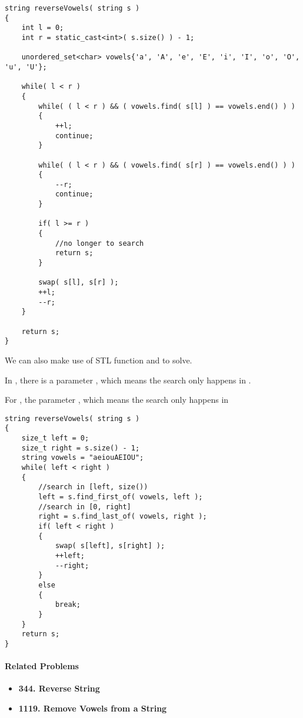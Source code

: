 \setcounter{lstlisting}{0}
\begin{lstlisting}[style=customc, caption={Two Pointers}]
string reverseVowels( string s )
{
    int l = 0;
    int r = static_cast<int>( s.size() ) - 1;

    unordered_set<char> vowels{'a', 'A', 'e', 'E', 'i', 'I', 'o', 'O', 'u', 'U'};

    while( l < r )
    {
        while( ( l < r ) && ( vowels.find( s[l] ) == vowels.end() ) )
        {
            ++l;
            continue;
        }

        while( ( l < r ) && ( vowels.find( s[r] ) == vowels.end() ) )
        {
            --r;
            continue;
        }

        if( l >= r )
        {
            //no longer to search
            return s;
        }

        swap( s[l], s[r] );
        ++l;
        --r;
    }

    return s;
}

\end{lstlisting}

We can also make use of STL function  and  to solve. 

In , there is a parameter , which means the search only happens in \fcc{s[pos, s.size())}.

For , the parameter , which means the search only happens in 

\begin{lstlisting}[style=customc, caption={STL}]
string reverseVowels( string s )
{
    size_t left = 0;
    size_t right = s.size() - 1;
    string vowels = "aeiouAEIOU";
    while( left < right )
    {
        //search in [left, size())
        left = s.find_first_of( vowels, left );
        //search in [0, right]
        right = s.find_last_of( vowels, right );
        if( left < right )
        {
            swap( s[left], s[right] );
            ++left;
            --right;
        }
        else
        {
            break;
        }
    }
    return s;
}
\end{lstlisting}

\paragraph{Related Problems}
\begin{itemize}
\item \textbf{344. Reverse String}
\item \textbf{1119. Remove Vowels from a String}
\end{itemize}